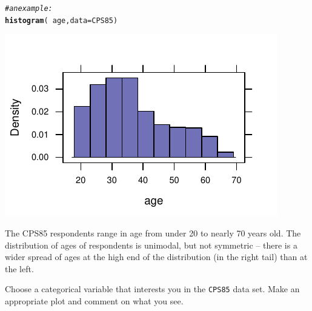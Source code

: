 \documentclass[twoside]{book}\usepackage[]{graphicx}\usepackage[]{xcolor}
\makeatletter
\def\maxwidth{ %
  \ifdim\Gin@nat@width>\linewidth
    \linewidth
  \else
    \Gin@nat@width
  \fi
}
\newcommand{\hlcom}[1]{\textcolor[rgb]{0.678,0.584,0.686}{\textit{#1}}}%
\newcommand{\hlopt}[1]{\textcolor[rgb]{0,0,0}{#1}}%
\newcommand{\hlstd}[1]{\textcolor[rgb]{0.345,0.345,0.345}{#1}}%
\newcommand{\hlkwc}[1]{\textcolor[rgb]{0.333,0.667,0.333}{#1}}%
\newcommand{\hlkwd}[1]{\textcolor[rgb]{0.737,0.353,0.396}{\textbf{#1}}}%
\newenvironment{kframe}{%
 \def\at@end@of@kframe{}%
 \ifinner\ifhmode%
  \def\at@end@of@kframe{\end{minipage}}%
  \begin{minipage}{\columnwidth}%
 \fi\fi%
 \def\FrameCommand##1{\hskip\@totalleftmargin \hskip-\fboxsep
 \colorbox{shadecolor}{##1}\hskip-\fboxsep
     \hskip-\linewidth \hskip-\@totalleftmargin \hskip\columnwidth}%
 \MakeFramed {\advance\hsize-\width
   \@totalleftmargin\z@ \linewidth\hsize
   \@setminipage}}%
 {\par\unskip\endMakeFramed%
 \at@end@of@kframe}
\newenvironment{knitrout}{}{} %
\newcommand{\Rindex}[1]{\index{\texttt{#1}}}
\newcommand{\dataframe}[1]{{\color{blue!80!black}\texttt{#1}}\Rindex{#1}}
\newcounter{example}[section]
\makeatother
\begin{document}
\begin{solution}
\begin{knitrout}
\color{fgcolor}\begin{kframe}
\begin{alltt}
\hlcom{#an example:}
\hlkwd{histogram}\hlstd{(} \hlopt{~} \hlstd{age ,} \hlkwc{data}\hlstd{=CPS85)}
\end{alltt}
\end{kframe}

{\centering \includegraphics[width=\maxwidth]{figures/fig-unnamed-chunk-21-1} 

}



\end{knitrout}
The CPS85 respondents range in age from under 20 to nearly 70 years old.  The distribution of ages of respondents is unimodal, but not symmetric -- there is a wider spread of ages at the high end of the distribution (in the right tail) than at the left. 
\end{solution}

\begin{problem}
	Choose a categorical variable that interests you in the \dataframe{CPS85}
	data set.  Make an appropriate plot and comment on what you see.
\end{problem}
\end{document}
